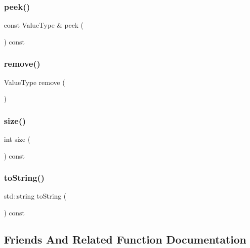 \mbox{\label{classQueue_a74501ededf728c31068dd28a70a8a1f2}} 
\subsubsection{\texorpdfstring{peek()}{peek()}}
{\footnotesize\ttfamily const Value\+Type \& peek (\begin{DoxyParamCaption}{ }\end{DoxyParamCaption}) const}

\mbox{\label{classQueue_a025ec97fa5b04552f5ad0902c1f02ac1}} 
\subsubsection{\texorpdfstring{remove()}{remove()}}
{\footnotesize\ttfamily Value\+Type remove (\begin{DoxyParamCaption}{ }\end{DoxyParamCaption})}

\mbox{\label{classQueue_af9593d4a5ff4274efaf429cb4f9e57cc}} 
\subsubsection{\texorpdfstring{size()}{size()}}
{\footnotesize\ttfamily int size (\begin{DoxyParamCaption}{ }\end{DoxyParamCaption}) const}

\mbox{\label{classQueue_a1fe5121d6528fdea3f243321b3fa3a49}} 
\subsubsection{\texorpdfstring{to\+String()}{toString()}}
{\footnotesize\ttfamily std\+::string to\+String (\begin{DoxyParamCaption}{ }\end{DoxyParamCaption}) const}



\subsection{Friends And Related Function Documentation}
\mbox{\label{classQueue_aacd62c6f29c1e575d1290a1088dd29e1}} 
